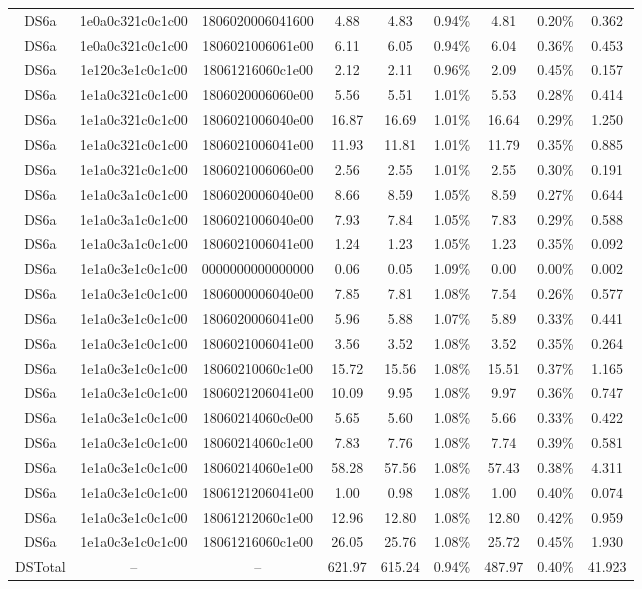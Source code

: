 \begin{tabular}{|c|c c|c|c c|c c|c|}
  DS6a & 1e0a0c321c0c1c00 & 1806020006041600 & 4.88 & 4.83 & 0.94\% & 4.81 & 0.20\% & 0.362 \\
  DS6a & 1e0a0c321c0c1c00 & 1806021006061e00 & 6.11 & 6.05 & 0.94\% & 6.04 & 0.36\% & 0.453 \\
  DS6a & 1e120c3e1c0c1c00 & 18061216060c1e00 & 2.12 & 2.11 & 0.96\% & 2.09 & 0.45\% & 0.157 \\
  DS6a & 1e1a0c321c0c1c00 & 1806020006060e00 & 5.56 & 5.51 & 1.01\% & 5.53 & 0.28\% & 0.414 \\
  DS6a & 1e1a0c321c0c1c00 & 1806021006040e00 & 16.87 & 16.69 & 1.01\% & 16.64 & 0.29\% & 1.250 \\
  DS6a & 1e1a0c321c0c1c00 & 1806021006041e00 & 11.93 & 11.81 & 1.01\% & 11.79 & 0.35\% & 0.885 \\
  DS6a & 1e1a0c321c0c1c00 & 1806021006060e00 & 2.56 & 2.55 & 1.01\% & 2.55 & 0.30\% & 0.191 \\
  DS6a & 1e1a0c3a1c0c1c00 & 1806020006040e00 & 8.66 & 8.59 & 1.05\% & 8.59 & 0.27\% & 0.644 \\
  DS6a & 1e1a0c3a1c0c1c00 & 1806021006040e00 & 7.93 & 7.84 & 1.05\% & 7.83 & 0.29\% & 0.588 \\
  DS6a & 1e1a0c3a1c0c1c00 & 1806021006041e00 & 1.24 & 1.23 & 1.05\% & 1.23 & 0.35\% & 0.092 \\
  DS6a & 1e1a0c3e1c0c1c00 & 0000000000000000 & 0.06 & 0.05 & 1.09\% & 0.00 & 0.00\% & 0.002 \\
  DS6a & 1e1a0c3e1c0c1c00 & 1806000006040e00 & 7.85 & 7.81 & 1.08\% & 7.54 & 0.26\% & 0.577 \\
  DS6a & 1e1a0c3e1c0c1c00 & 1806020006041e00 & 5.96 & 5.88 & 1.07\% & 5.89 & 0.33\% & 0.441 \\
  DS6a & 1e1a0c3e1c0c1c00 & 1806021006041e00 & 3.56 & 3.52 & 1.08\% & 3.52 & 0.35\% & 0.264 \\
  DS6a & 1e1a0c3e1c0c1c00 & 18060210060c1e00 & 15.72 & 15.56 & 1.08\% & 15.51 & 0.37\% & 1.165 \\
  DS6a & 1e1a0c3e1c0c1c00 & 1806021206041e00 & 10.09 & 9.95 & 1.08\% & 9.97 & 0.36\% & 0.747 \\
  DS6a & 1e1a0c3e1c0c1c00 & 18060214060c0e00 & 5.65 & 5.60 & 1.08\% & 5.66 & 0.33\% & 0.422 \\
  DS6a & 1e1a0c3e1c0c1c00 & 18060214060c1e00 & 7.83 & 7.76 & 1.08\% & 7.74 & 0.39\% & 0.581 \\
  DS6a & 1e1a0c3e1c0c1c00 & 18060214060e1e00 & 58.28 & 57.56 & 1.08\% & 57.43 & 0.38\% & 4.311 \\
  DS6a & 1e1a0c3e1c0c1c00 & 1806121206041e00 & 1.00 & 0.98 & 1.08\% & 1.00 & 0.40\% & 0.074 \\
  DS6a & 1e1a0c3e1c0c1c00 & 18061212060c1e00 & 12.96 & 12.80 & 1.08\% & 12.80 & 0.42\% & 0.959 \\
  DS6a & 1e1a0c3e1c0c1c00 & 18061216060c1e00 & 26.05 & 25.76 & 1.08\% & 25.72 & 0.45\% & 1.930 \\
  DSTotal & -- & -- & 621.97 & 615.24 & 0.94\% & 487.97 & 0.40\% & 41.923 \\
\hline
\end{tabular}
